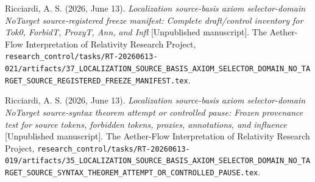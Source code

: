 \documentclass[11pt]{article}
\begin{document}
Ricciardi, A. S. (2026, June 13). \emph{Localization source-basis axiom
selector-domain NoTarget source-registered freeze manifest: Complete
draft/control inventory for Tok0, ForbidT, ProxyT, Ann, and Infl}
[Unpublished manuscript]. The Aether-Flow Interpretation of Relativity
Research Project,
\texttt{research\_control/tasks/RT-20260613-021/artifacts/37\_LOCALIZATION\_SOURCE\_BASIS\_AXIOM\_SELECTOR\_DOMAIN\_NO\_TARGET\_SOURCE\_REGISTERED\_FREEZE\_MANIFEST.tex}.

Ricciardi, A. S. (2026, June 13). \emph{Localization source-basis axiom
selector-domain NoTarget source-syntax theorem attempt or controlled pause:
Frozen provenance test for source tokens, forbidden tokens, proxies,
annotations, and influence} [Unpublished manuscript]. The Aether-Flow
Interpretation of Relativity Research Project,
\texttt{research\_control/tasks/RT-20260613-019/artifacts/35\_LOCALIZATION\_SOURCE\_BASIS\_AXIOM\_SELECTOR\_DOMAIN\_NO\_TARGET\_SOURCE\_SYNTAX\_THEOREM\_ATTEMPT\_OR\_CONTROLLED\_PAUSE.tex}.
\end{document}
